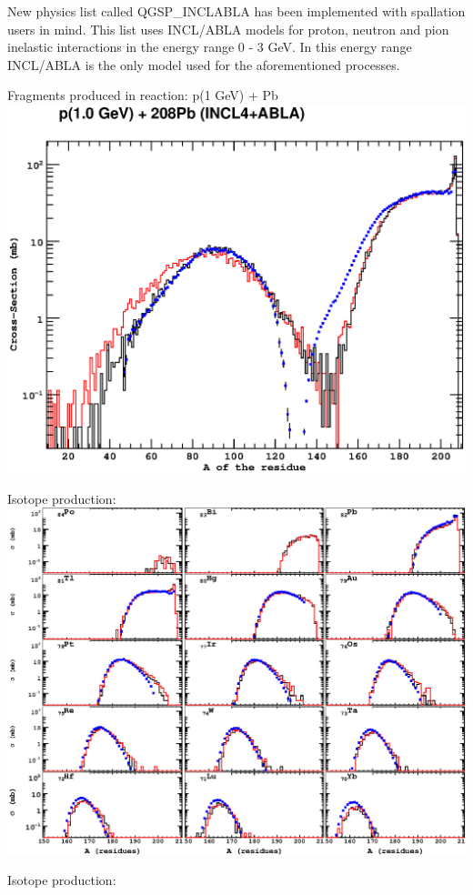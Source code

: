 \documentclass[20pt]{article}
\newenvironment{textbox}
{\begin{lrbox}{\dummybox}\begin{minipage}{0.9\columnwidth}}
{\end{minipage}\end{lrbox}\raisebox{-\depth}{\psshadowbox[framesep=1em,framearc=.1,shadow=true]{\usebox{\dummybox}}}\vspace{0.005\textheight}}
\begin{document}
\begin{center}
\begin{multicols}{3}
\begin{textbox}
{New physics list called {\sf QGSP\_INCLABLA} has been implemented with
spallation users in mind. This list uses INCL/ABLA models for proton,
neutron and pion inelastic interactions in the energy range 0 - 3
GeV. In this energy range INCL/ABLA is the only model used for the
aforementioned processes.

Fragments produced in reaction: p(1 GeV) + Pb
\includegraphics[scale=0.5]{images/fragments.eps}

Isotope production:
\includegraphics[scale=0.5]{images/pPbIsotopes.eps}

Isotope production:

}
\end{textbox}


\end{multicols}
\end{center}
\end{document}
